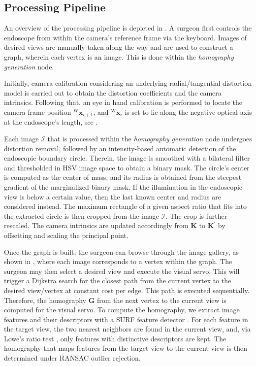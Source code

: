 \subsection{Processing Pipeline}
\label{c2:sec:pipe}

An overview of the processing pipeline is depicted in . A surgeon first controls the endoscope from within the camera's reference frame via the keyboard. Images of desired views are manually taken along the way and are used to construct a graph, wherein each vertex is an image. This is done within the \textit{homography generation} node. 

Initially, camera calibration considering an underlying radial/tangential distortion model is carried out to obtain the distortion coefficients and the camera intrinsics. Following that, an eye in hand calibration is performed to locate the camera frame position $^\text{W}\mathbf{x}_{i+1}$, and $^\text{W}\mathbf{x}_i$ is set to lie along the negative optical axis at the endoscope's length, see . 

Each image $\mathcal{I}$ that is processed within the \textit{homography generation} node undergoes distortion removal, followed by an intensity-based automatic detection of the endoscopic boundary circle. Therein, the image is smoothed with a bilateral filter and thresholded in HSV image space to obtain a binary mask. The circle's center is computed as the center of mass, and its radius is obtained from the steepest gradient of the marginalized binary mask. If the illumination in the endoscopic view is below a certain value, then the last known center and radius are considered instead. The maximum rectangle of a given aspect ratio that fits into the extracted circle is then cropped from the image $\mathcal{I}$. The crop is further rescaled. The camera intrinsics are updated accordingly from $\mathbf{K}$ to $\mathbf{K}^\prime$ by offsetting and scaling the principal point. 

Once the graph is built, the surgeon can browse through the image gallery, as shown in , where each image corresponds to a vertex within the graph. The surgeon may then select a desired view and execute the visual servo. This will trigger a Dijkstra search for the closest path from the current vertex to the desired view/vertex at constant cost per edge. This path is executed sequentially. Therefore, the homography $\mathbf{G}$ from the next vertex to the current view is computed for the visual servo. To compute the homography, we extract image features and their descriptors with a SURF feature detector \cite{bay2006surf}. For each feature in the target view, the two nearest neighbors are found in the current view, and, via Lowe's ratio test \cite{lowe2004distinctive}, only features with distinctive descriptors are kept. The homography that maps features from the target view to the current view is then determined under RANSAC outlier rejection.

